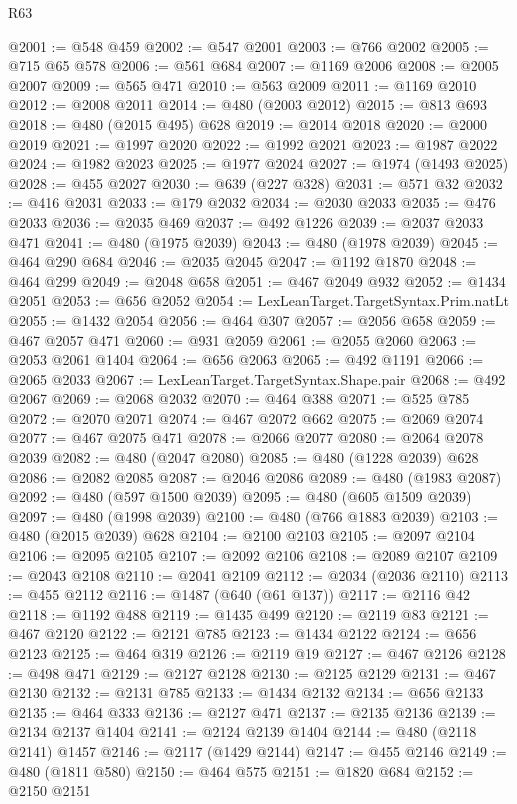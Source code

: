 \begin{lexlean}{R63}
\begin{coremodule}
@2001 := @548 @459
@2002 := @547 @2001
@2003 := @766 @2002
@2005 := @715 @65 @578
@2006 := @561 @684
@2007 := @1169 @2006
@2008 := @2005 @2007
@2009 := @565 @471
@2010 := @563 @2009
@2011 := @1169 @2010
@2012 := @2008 @2011
@2014 := @480 (@2003 @2012)
@2015 := @813 @693
@2018 := @480 (@2015 @495) @628
@2019 := @2014 @2018
@2020 := @2000 @2019
@2021 := @1997 @2020
@2022 := @1992 @2021
@2023 := @1987 @2022
@2024 := @1982 @2023
@2025 := @1977 @2024
@2027 := @1974 (@1493 @2025)
@2028 := @455 @2027
@2030 := @639 (@227 @328)
@2031 := @571 @32
@2032 := @416 @2031
@2033 := @179 @2032
@2034 := @2030 @2033
@2035 := @476 @2033
@2036 := @2035 @469
@2037 := @492 @1226
@2039 := @2037 @2033 @471
@2041 := @480 (@1975 @2039)
@2043 := @480 (@1978 @2039)
@2045 := @464 @290 @684
@2046 := @2035 @2045
@2047 := @1192 @1870
@2048 := @464 @299
@2049 := @2048 @658
@2051 := @467 @2049 @932
@2052 := @1434 @2051
@2053 := @656 @2052
@2054 := LexLeanTarget.TargetSyntax.Prim.natLt
@2055 := @1432 @2054
@2056 := @464 @307
@2057 := @2056 @658
@2059 := @467 @2057 @471
@2060 := @931 @2059
@2061 := @2055 @2060
@2063 := @2053 @2061 @1404
@2064 := @656 @2063
@2065 := @492 @1191
@2066 := @2065 @2033
@2067 := LexLeanTarget.TargetSyntax.Shape.pair
@2068 := @492 @2067
@2069 := @2068 @2032
@2070 := @464 @388
@2071 := @525 @785
@2072 := @2070 @2071
@2074 := @467 @2072 @662
@2075 := @2069 @2074
@2077 := @467 @2075 @471
@2078 := @2066 @2077
@2080 := @2064 @2078 @2039
@2082 := @480 (@2047 @2080)
@2085 := @480 (@1228 @2039) @628
@2086 := @2082 @2085
@2087 := @2046 @2086
@2089 := @480 (@1983 @2087)
@2092 := @480 (@597 @1500 @2039)
@2095 := @480 (@605 @1509 @2039)
@2097 := @480 (@1998 @2039)
@2100 := @480 (@766 @1883 @2039)
@2103 := @480 (@2015 @2039) @628
@2104 := @2100 @2103
@2105 := @2097 @2104
@2106 := @2095 @2105
@2107 := @2092 @2106
@2108 := @2089 @2107
@2109 := @2043 @2108
@2110 := @2041 @2109
@2112 := @2034 (@2036 @2110)
@2113 := @455 @2112
@2116 := @1487 (@640 (@61 @137))
@2117 := @2116 @42
@2118 := @1192 @488
@2119 := @1435 @499
@2120 := @2119 @83
@2121 := @467 @2120
@2122 := @2121 @785
@2123 := @1434 @2122
@2124 := @656 @2123
@2125 := @464 @319
@2126 := @2119 @19
@2127 := @467 @2126
@2128 := @498 @471
@2129 := @2127 @2128
@2130 := @2125 @2129
@2131 := @467 @2130
@2132 := @2131 @785
@2133 := @1434 @2132
@2134 := @656 @2133
@2135 := @464 @333
@2136 := @2127 @471
@2137 := @2135 @2136
@2139 := @2134 @2137 @1404
@2141 := @2124 @2139 @1404
@2144 := @480 (@2118 @2141) @1457
@2146 := @2117 (@1429 @2144)
@2147 := @455 @2146
@2149 := @480 (@1811 @580)
@2150 := @464 @575
@2151 := @1820 @684
@2152 := @2150 @2151

\end{coremodule}
\end{lexlean}
